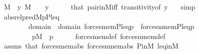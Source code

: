 \begin{isabellebody}
\ {}{\isacharcolon}{\kern0pt}{\isachardoublequoteopen}{\isasymsigma}{\isasymin}M{\isachardoublequoteclose}\ \ {\isachardoublequoteopen}{\isasymlangle}{\isasymsigma}{\isacharcomma}{\kern0pt}y{\isasymrangle}{\isasymin}{\isasymdelta}{\isachardoublequoteclose}\ {\isachardoublequoteopen}{\isasymdelta}{\isasymin}M{\isachardoublequoteclose}\ \ {\isasymsigma}\ {\isasymdelta}\ y\isanewline
\ \ \ \ \isamarkupfalse%
\ that\ pair{\isacharunderscore}{\kern0pt}in{\isacharunderscore}{\kern0pt}M{\isacharunderscore}{\kern0pt}iff\ transitivity{\isacharbrackleft}{\kern0pt}of\ {\isachardoublequoteopen}{\isasymlangle}{\isasymsigma}{\isacharcomma}{\kern0pt}y{\isasymrangle}{\isachardoublequoteclose}\ {\isasymdelta}{\isacharbrackright}{\kern0pt}\ \isamarkupfalse%
\ simp\isanewline
\ \ \isamarkupfalse%
\ abs{}{\isacharcolon}{\kern0pt}{\isachardoublequoteopen}{\isacharquery}{\kern0pt}rel{\isacharunderscore}{\kern0pt}pred{\isacharparenleft}{\kern0pt}{\isacharhash}{\kern0pt}{\isacharhash}{\kern0pt}M{\isacharcomma}{\kern0pt}p{\isacharcomma}{\kern0pt}P{\isacharcomma}{\kern0pt}leq{\isacharcomma}{\kern0pt}{\isasymtau}{\isacharcomma}{\kern0pt}{\isasymtheta}{\isacharparenright}{\kern0pt}\ {\isasymlongleftrightarrow}\ \isanewline
\ \ \ \ \ \ \ \ {\isacharparenleft}{\kern0pt}{\isasymexists}{\isasymsigma}{\isasymin}domain{\isacharparenleft}{\kern0pt}{\isasymtau}{\isacharparenright}{\kern0pt}\ {\isasymunion}\ domain{\isacharparenleft}{\kern0pt}{\isasymtheta}{\isacharparenright}{\kern0pt}{\isachardot}{\kern0pt}\ forces{\isacharunderscore}{\kern0pt}mem{\isacharprime}{\kern0pt}{\isacharparenleft}{\kern0pt}P{\isacharcomma}{\kern0pt}leq{\isacharcomma}{\kern0pt}p{\isacharcomma}{\kern0pt}{\isasymsigma}{\isacharcomma}{\kern0pt}{\isasymtau}{\isacharparenright}{\kern0pt}\ {\isasymand}\ forces{\isacharunderscore}{\kern0pt}nmem{\isacharprime}{\kern0pt}{\isacharparenleft}{\kern0pt}P{\isacharcomma}{\kern0pt}leq{\isacharcomma}{\kern0pt}p{\isacharcomma}{\kern0pt}{\isasymsigma}{\isacharcomma}{\kern0pt}{\isasymtheta}{\isacharparenright}{\kern0pt}{\isacharparenright}{\kern0pt}{\isachardoublequoteclose}\ \isanewline
\ \ \ \ \ \ \ \ \ {\isachardoublequoteopen}p{\isasymin}M{\isachardoublequoteclose}\ \ p\isanewline
\ \ \ \ \isamarkupfalse%
\ forces{\isacharunderscore}{\kern0pt}mem{\isacharunderscore}{\kern0pt}def\ forces{\isacharunderscore}{\kern0pt}nmem{\isacharunderscore}{\kern0pt}def\isanewline
\ \ \ \ \isamarkupfalse%
\ assms\ that\ forces{\isacharunderscore}{\kern0pt}mem{\isacharprime}{\kern0pt}{\isacharunderscore}{\kern0pt}abs\ forces{\isacharunderscore}{\kern0pt}nmem{\isacharprime}{\kern0pt}{\isacharunderscore}{\kern0pt}abs\ P{\isacharunderscore}{\kern0pt}in{\isacharunderscore}{\kern0pt}M\ leq{\isacharunderscore}{\kern0pt}in{\isacharunderscore}{\kern0pt}M\ \isanewline

\end{isabellebody}
